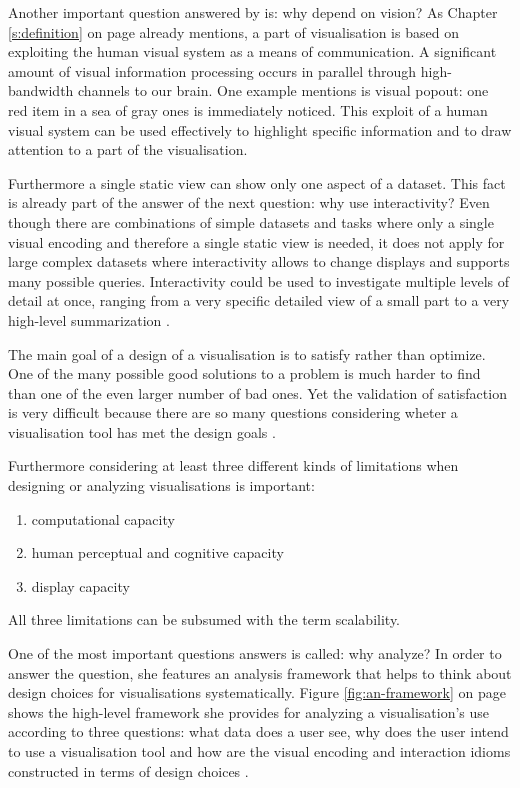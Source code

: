 
Another important question answered by \citeauthor{Munzner2014} is: why depend on vision? As Chapter \ref{s:definition} on page \pageref{s:definition} already mentions, a part of visualisation is based on exploiting the human visual system as a means of communication. A significant amount of visual information processing occurs in parallel through high-bandwidth channels to our brain. One example \citeauthor{Munzner2014} mentions is visual popout: one red item in a sea of gray ones is immediately noticed. This exploit of a human visual system can be used effectively to highlight specific information and to draw attention to a part of the visualisation.

Furthermore a single static view can show only one aspect of a dataset. This fact is already part of the answer of the next question: why use interactivity? Even though there are combinations of simple datasets and tasks where only a single visual encoding and therefore a single static view is needed, it does not apply for large complex datasets where interactivity allows to change displays and supports many possible queries. Interactivity could be used to investigate multiple levels of detail at once, ranging from a very specific detailed view of a small part to a very high-level summarization .

The main goal of a design of a visualisation is to satisfy rather than optimize. One of the many possible good solutions to a problem is much harder to find than one of the even larger number of bad ones. Yet the validation of satisfaction is very difficult because there are so many questions considering wheter a visualisation tool has met the design goals .

Furthermore considering at least three different kinds of limitations when designing or analyzing visualisations is important:
\begin{enumerate}
\item computational capacity
\item human perceptual and cognitive capacity
\item display capacity
\end{enumerate}

All three limitations can be subsumed with the term scalability.

One of the most important questions \citeauthor{Munzner2014} answers is called: why analyze? In order to answer the question, she features an analysis framework that helps to think about design choices for visualisations systematically. Figure \ref{fig:an-framework} on page \pageref{fig:an-framework} shows the high-level framework she provides for analyzing a visualisation's use according to three questions: what data does a user see, why does the user intend to use a visualisation tool and how are the visual encoding and interaction idioms constructed in terms of design choices .

